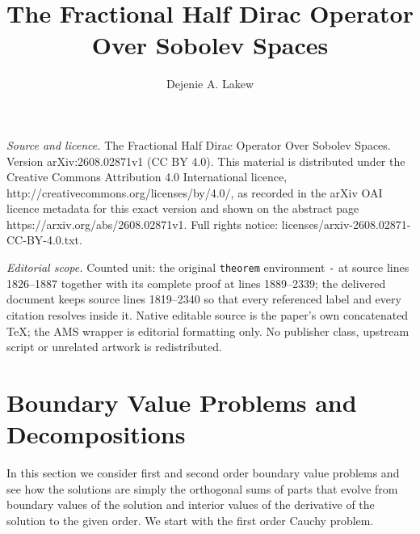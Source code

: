\documentclass[10pt,a4paper]{amsart}
\numberwithin{equation}{section}
\begin{document}
\title[The Fractional Half Dirac Operator Over Sobolev Spaces]{The Fractional Half Dirac Operator Over Sobolev Spaces}
\author{Dejenie A. Lakew}
\date{}
\maketitle
\noindent\emph{Source and licence.} The Fractional Half Dirac Operator Over Sobolev Spaces. Version arXiv:2608.02871v1 (CC BY 4.0). This material is distributed under the Creative Commons Attribution 4.0 International licence, http://creativecommons.org/licenses/by/4.0/, as recorded in the arXiv OAI licence metadata for this exact version and shown on the abstract page https://arxiv.org/abs/2608.02871v1. Full rights notice: licenses/arxiv-2608.02871-CC-BY-4.0.txt.\par\smallskip
\noindent\textit{Editorial scope.} Counted unit: the original \texttt{theorem} environment \texttt{-} at source lines 1826--1887 together with its complete proof at lines 1889--2339; the delivered document keeps source lines 1819--2340 so that every referenced label and every citation resolves inside it. Native editable source is the paper's own concatenated TeX; the AMS wrapper is editorial formatting only. No publisher class, upstream script or unrelated artwork is redistributed.
\section{Boundary Value Problems and Decompositions}

In this section we consider first and second order boundary value problems and
see how the solutions are simply the orthogonal sums of parts that evolve from
boundary values of the solution and interior values of the derivative of the
solution to the given order. We start with the first order Cauchy problem.
\end{document}
